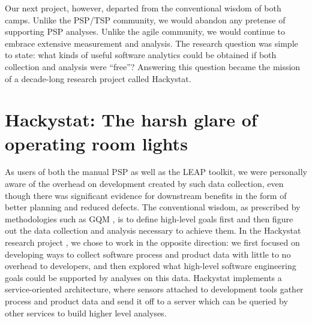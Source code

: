 \documentclass[]{article}
\begin{document}
Our next project, however, departed from the conventional wisdom of both camps. Unlike the
PSP/TSP community, we would abandon any pretense of supporting PSP analyses.  Unlike the
agile community, we would continue to embrace extensive measurement and analysis.  The
research question was simple to state: what kinds of useful software analytics could be
obtained if both collection and analysis were ``free''?  Answering this question became
the mission of a decade-long research project called Hackystat.

\section{Hackystat:  The harsh glare of operating room lights}

As users of both the manual PSP as well as the LEAP toolkit, we were personally aware of
the overhead on development created by such data collection, even though there was
significant evidence for downstream benefits in the form of better planning and reduced
defects. The conventional wisdom, as prescribed by methodologies such as GQM
\cite{Basili94gqm}, is to define high-level goals first and then figure out the data
collection and analysis necessary to achieve them.  In the Hackystat research project
\cite{csdl2-02-07}, we chose to work in the opposite direction: we first focused on
developing ways to collect software process and product data with little to no overhead to
developers, and then explored what high-level software engineering goals could be
supported by analyses on this data. Hackystat implements a service-oriented architecture,
where sensors attached to development tools gather process and product data and send it
off to a server which can be queried by other services to build higher level analyses. 
\end{document}

